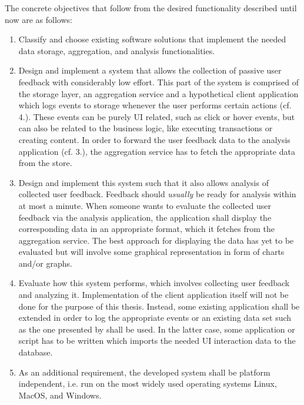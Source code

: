 The concrete objectives that follow from the desired functionality described until now are as follows:

\begin{enumerate}
\item Classify and choose existing software solutions that implement the needed data storage, aggregation, and analysis functionalities.
\item Design and implement a system that allows the collection of passive user feedback with considerably low effort.
This part of the system is comprised of the storage layer, an aggregation service and a hypothetical client application which logs events to storage whenever the user performs certain actions (cf. 4.).
These events can be purely UI related, such as click or hover events, but can also be related to the business logic, like executing transactions or creating content.
In order to forward the user feedback data to the analysis application (cf. 3.), the aggregation service has to fetch the appropriate data from the store.
\item Design and implement this system such that it also allows analysis of collected user feedback.
Feedback should \emph{usually} be ready for analysis within at most a minute.
When someone wants to evaluate the collected user feedback via the analysis application, the application shall display the corresponding data in an appropriate format, which it fetches from the aggregation service.
The best approach for displaying the data has yet to be evaluated but will involve some graphical representation in form of charts and/or graphs.
\item Evaluate how this system performs, which involves collecting user feedback and analyzing it.
Implementation of the client application itself will not be done for the purpose of this thesis.
Instead, some existing application shall be extended in order to log the appropriate events or an existing data set such as the one presented by \citet{Deka:2017:Rico} shall be used.
In the latter case, some application or script has to be written which imports the needed UI interaction data to the database.
\item As an additional requirement, the developed system shall be platform independent, i.e. run on the most widely used operating systems Linux, MacOS, and Windows.
\end{enumerate}

